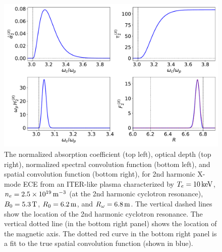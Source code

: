 \documentclass[12pt,prb,aps]{revtex4-1}
\begin{document}
\begin{figure}
\centerline{\includegraphics[width=\textwidth]{Fig22.pdf}}
\caption{The normalized  absorption coefficient (top left), optical depth (top right), normalized
spectral convolution function (bottom left), and spatial convolution function (bottom right), for 2nd  harmonic X-mode ECE from an 
ITER-like plasma characterized by  $T_e=10\,{\rm keV}$, $n_e=2.5\times  10^{19}\,{\rm m}^{-3}$ (at the 2nd harmonic cyclotron resonance), $B_0=5.3\,{\rm T}$, $R_0=6.2\,{\rm m}$, and $R_\omega= 6.8\,{\rm m}$.
The vertical dashed lines show the location of the 2nd harmonic cyclotron resonance.  The vertical dotted line (in the bottom right panel) shows the location of the  magnetic axis.
The dotted red curve in the bottom right panel is a  fit to the true spatial convolution function (shown in blue).
\label{Xmode}}
\end{figure}
\end{document}
